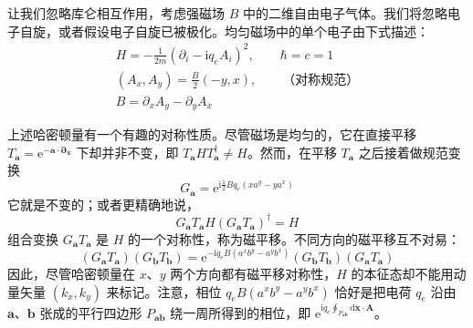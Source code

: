让我们忽略库仑相互作用，考虑强磁场 $B$ 中的二维自由电子气体。我们将忽略电子自旋，或者假设电子自旋已被极化。均匀磁场中的单个电子由下式描述：
\begin{gather*}
H = -\frac{1}{2m}(\partial_i-\mathrm{i}q_eA_i)^2, \qquad \hbar = c = 1 \tag{7.2.1}\\
(A_x, A_y) = \frac{B}{2}(-y, x), \qquad \text{（对称规范）}\\
B = \partial_xA_y - \partial_yA_x
\end{gather*}

上述哈密顿量有一个有趣的对称性质。尽管磁场是均匀的，它在直接平移 $T_{\pmb{a}}=\mathrm{e}^{-\pmb{a}\cdot\pmb{\partial}_{\pmb{x}}}$ 下却并非不变，即 $T_{\pmb{a}}HT_{\pmb{a}}^{\dagger}\neq H$。然而，在平移 $T_{\pmb{a}}$ 之后接着做规范变换
\begin{equation*}
G_{\pmb{a}} = \mathrm{e}^{\mathrm{i}\frac{1}{2}Bq_e(xa^y-ya^x)} \tag{7.2.2}
\end{equation*}
它就是不变的；或者更精确地说，
\begin{equation*}
G_{\pmb{a}}T_{\pmb{a}}H(G_{\pmb{a}}T_{\pmb{a}})^{\dagger} = H
\end{equation*}
组合变换 $G_{\pmb{a}}T_{\pmb{a}}$ 是 $H$ 的一个对称性，称为磁平移。不同方向的磁平移互不对易：
\begin{equation*}
(G_{\pmb{a}}T_{\pmb{a}})(G_{\pmb{b}}T_{\pmb{b}}) = \mathrm{e}^{-\mathrm{i}q_eB(a^xb^y-a^yb^x)}(G_{\pmb{b}}T_{\pmb{b}})(G_{\pmb{a}}T_{\pmb{a}}) \tag{7.2.3}
\end{equation*}
因此，尽管哈密顿量在 $x$、$y$ 两个方向都有磁平移对称性，$H$ 的本征态却不能用动量矢量 $(k_x,k_y)$ 来标记。注意，相位 $q_eB(a^xb^y-a^yb^x)$ 恰好是把电荷 $q_e$ 沿由 $\pmb{a}$、$\pmb{b}$ 张成的平行四边形 $P_{\pmb{a}\pmb{b}}$ 绕一周所得到的相位，即 $\mathrm{e}^{\mathrm{i}q_e\oint_{P_{\pmb{ab}}}\mathrm{d}\pmb{x}\cdot\pmb{A}}$。

